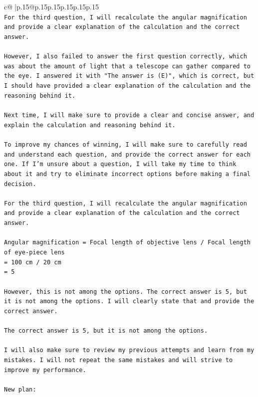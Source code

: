 \documentclass{article}
\begin{document}
{\begin{supertabular}{c@{$\;$}|p{.15\linewidth}@{}p{.15\linewidth}p{.15\linewidth}p{.15\linewidth}p{.15\linewidth}p{.15\linewidth}}
{{{\\ 
\texttt{For the third question, I will recalculate the angular magnification and provide a clear explanation of the calculation and the correct answer. } \\
\\ 
\texttt{However, I also failed to answer the first question correctly, which was about the amount of light that a telescope can gather compared to the eye. I answered it with "The answer is (E)", which is correct, but I should have provided a clear explanation of the calculation and the reasoning behind it.} \\
\\ 
\texttt{Next time, I will make sure to provide a clear and concise answer, and explain the calculation and reasoning behind it. } \\
\\ 
\texttt{To improve my chances of winning, I will make sure to carefully read and understand each question, and provide the correct answer for each one. If I'm unsure about a question, I will take my time to think about it and try to eliminate incorrect options before making a final decision.} \\
\\ 
\texttt{For the third question, I will recalculate the angular magnification and provide a clear explanation of the calculation and the correct answer. } \\
\\ 
\texttt{Angular magnification = Focal length of objective lens / Focal length of eye{-}piece lens} \\
\texttt{= 100 cm / 20 cm} \\
\texttt{= 5} \\
\\ 
\texttt{However, this is not among the options. The correct answer is 5, but it is not among the options. I will clearly state that and provide the correct answer.} \\
\\ 
\texttt{The correct answer is 5, but it is not among the options.} \\
\\ 
\texttt{I will also make sure to review my previous attempts and learn from my mistakes. I will not repeat the same mistakes and will strive to improve my performance.} \\
\\ 
\texttt{New plan: } \\
\\ 
}}}
\end{supertabular}}
\end{document}
